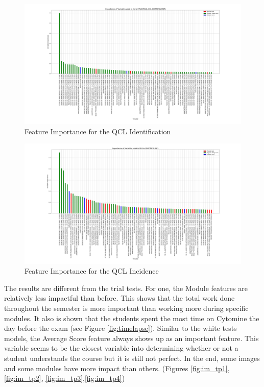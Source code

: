 \documentclass[a4paper,11pt]{report}
\numberwithin{figure}{section} %
\begin{document}
      \begin{figure}[H]
      \centering
      \includegraphics[width=.95\linewidth]{plots/var_importance_PRACTICAL_QCL_IDENTIFICATION_2018-04-29_14_34_11.png}
      \caption{Feature Importance for the QCL Identification}
      \label{fig:var_tp3}
      \end{figure}

      \begin{figure}[H]
      \centering
      \includegraphics[width=.95\linewidth]{plots/var_importance_PRACTICAL_QCL_2018-04-29_14_33_44.png}
      \caption{Feature Importance for the QCL Incidence}
      \label{fig:var_tp4}
      \end{figure}

The results are different from the trial tests.
For one, the Module features are relatively less impactful than before.
This shows that the total work done throughout the semester is more important than working more during specific modules.
It also is shown that the students spent the most time on Cytomine the day before the exam (see Figure \ref{fig:timelapse}).
Similar to the white tests models, the Average Score feature always shows up as an important feature.
This variable seems to be the closest variable into determining whether or not a student understands the course but it is still not perfect.
In the end, some images and some modules have more impact than others.  (Figures \ref{fig:im_tp1}, \ref{fig:im_tp2}, \ref{fig:im_tp3},\ref{fig:im_tp4})
\end{document}
